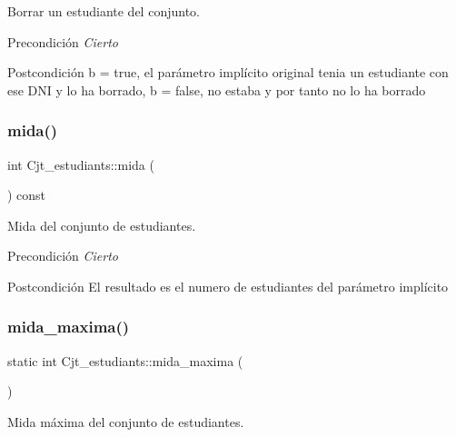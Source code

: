 Borrar un estudiante del conjunto. 

\begin{DoxyPrecond}{Precondición}
{\itshape Cierto} 
\end{DoxyPrecond}
\begin{DoxyPostcond}{Postcondición}
b = true, el parámetro implícito original tenia un estudiante con ese D\+NI y lo ha borrado, b = false, no estaba y por tanto no lo ha borrado 
\end{DoxyPostcond}
\mbox{\label{class_cjt__estudiants_a87c69704a0eff48a301cfff05e6dd587}} 
\subsubsection{\texorpdfstring{mida()}{mida()}}
{\footnotesize\ttfamily int Cjt\+\_\+estudiants\+::mida (\begin{DoxyParamCaption}{ }\end{DoxyParamCaption}) const}



Mida del conjunto de estudiantes. 

\begin{DoxyPrecond}{Precondición}
{\itshape Cierto} 
\end{DoxyPrecond}
\begin{DoxyPostcond}{Postcondición}
El resultado es el numero de estudiantes del parámetro implícito 
\end{DoxyPostcond}
\mbox{\label{class_cjt__estudiants_a171fdff58b408ccbf647ab594b5eafa4}} 
\subsubsection{\texorpdfstring{mida\+\_\+maxima()}{mida\_maxima()}}
{\footnotesize\ttfamily static int Cjt\+\_\+estudiants\+::mida\+\_\+maxima (\begin{DoxyParamCaption}{ }\end{DoxyParamCaption})\hspace{0.3cm}{\ttfamily [static]}}



Mida máxima del conjunto de estudiantes. 

